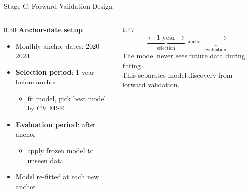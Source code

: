 \documentclass[aspectratio=169]{beamer}
\begin{document}
\begin{frame}{Stage C: Forward Validation Design}
  \begin{columns}[T]
    \begin{column}{0.50\textwidth}
      \textbf{Anchor-date setup}
      \vspace{0.5em}
      \begin{itemize}
        \item Monthly anchor dates: 2020--2024
        \item \textbf{Selection period}: 1 year before anchor
        \begin{itemize}
          \item fit model, pick best model by CV-MSE
        \end{itemize}
        \item \textbf{Evaluation period}: after anchor
        \begin{itemize}
          \item apply frozen model to unseen data
        \end{itemize}
        \item Model re-fitted at each new anchor
      \end{itemize}
    \end{column}
    \begin{column}{0.47\textwidth}
      \vspace{1em}
      \[
        \underbrace{\longleftarrow\text{1 year}\longrightarrow}_{\text{selection}}
        \Big|_{\text{anchor}}
        \underbrace{\longrightarrow}_{\text{evaluation}}
      \]
      \vspace{1em}
      \small
      The model never sees future data during fitting.\\[0.5em]
      This separates model discovery from forward validation.
    \end{column}
  \end{columns}
\end{frame}
\end{document}
